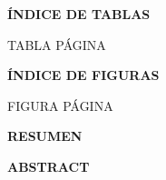 \documentclass[12pt]{article}
\begin{document}
\newpage

\begin{center}
{\fontsize{14}{14}\selectfont \bf ÍNDICE DE TABLAS}\\
\end{center}
{}

\begin{flushright} \small
TABLA \hspace{11.6cm} PÁGINA\\
\end{flushright}

\vspace{-1.0cm}

\begin{spacing}{1.2}
{\fontsize{10}{10}\selectfont \listoftables}
\end{spacing}

\newpage

\begin{center}
{\fontsize{14}{14}\selectfont \bf ÍNDICE DE FIGURAS}\\
\end{center}
{}


\begin{flushright} \small
FIGURA \hspace{11.45cm} PÁGINA\\
\end{flushright}

\vspace{-1.0cm}

\begin{spacing}{1.2}
{\fontsize{10}{10}\selectfont \listoffigures}
\end{spacing}

\newpage


\begin{center}
{\fontsize{14}{14}\selectfont \bf RESUMEN}\\
\end{center}
{}



\newpage

\begin{center}
{\fontsize{14}{14}\selectfont \bf ABSTRACT}\\
\end{center}
{}

\end{document}
